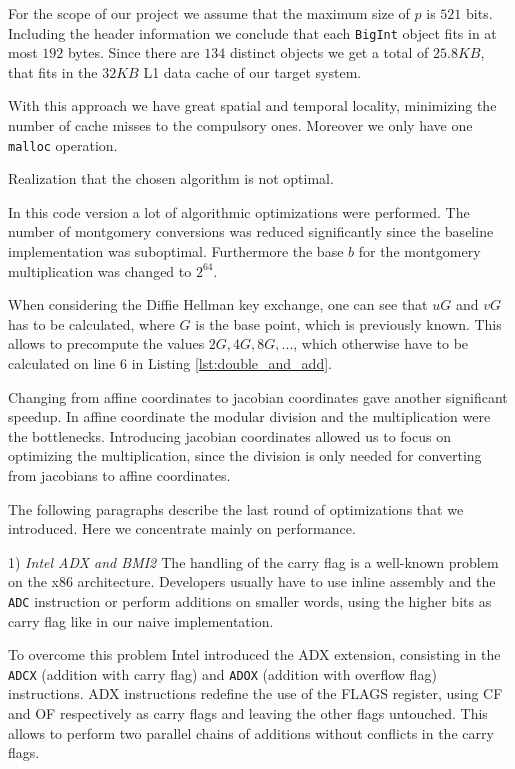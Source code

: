 For the scope of our project we assume that the maximum size of $p$ is $521$ bits. Including the header information we conclude that each \texttt{BigInt} object fits in at most $192$ bytes. Since there are $134$ distinct objects we get a total of $25.8KB$, that fits in the $32KB$ L1 data cache of our target system.

With this approach we have great spatial and temporal locality, minimizing the number of cache misses to the compulsory ones. Moreover we only have one \texttt{malloc} operation.

Realization that the chosen algorithm is not optimal.

In this code version a lot of algorithmic optimizations were performed. The number of montgomery conversions was reduced significantly since the baseline implementation was suboptimal. Furthermore the base $b$ for the montgomery multiplication was changed to $2^{64}$.

When considering the Diffie Hellman key exchange, one can see that $uG$ and $vG$ has to be calculated, where $G$ is the base point, which is previously known. This allows to precompute the values $2G, 4G, 8G,...$, which otherwise have to be calculated on line 6 in Listing \ref{lst:double_and_add}.

Changing from affine coordinates to jacobian coordinates gave another significant speedup. In affine coordinate the modular division and the multiplication were the bottlenecks. Introducing jacobian coordinates allowed us to focus on optimizing the multiplication, since the division is only needed for converting from jacobians to affine coordinates.

The following paragraphs describe the last round of optimizations that we introduced. Here we concentrate mainly on performance. 

1) \emph{Intel ADX and BMI2 \cite{Otzturk:2012}} 
The handling of the carry flag is a well-known problem on the x86 architecture. Developers usually have to use inline assembly and the \texttt{ADC} instruction or perform additions on smaller words, using the higher bits as carry flag like in our naive implementation.

To overcome this problem Intel introduced the ADX extension, consisting in the \texttt{ADCX} (addition with carry flag) and \texttt{ADOX} (addition with overflow flag) instructions. ADX instructions redefine the use of the FLAGS register, using CF and OF respectively as carry flags and leaving the other flags untouched. This allows to perform two parallel chains of additions without conflicts in the carry flags.

